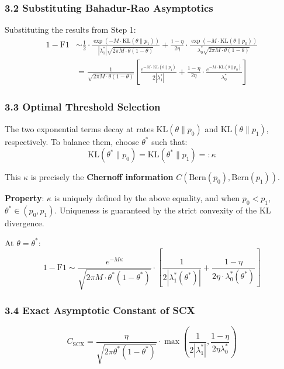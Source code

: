 \documentclass[
  12pt,
]{ctexart}
\begin{document}
\subsubsection{3.2 Substituting Bahadur-Rao Asymptotics}\label{substituting-bahadur-rao-asymptotics}

Substituting the results from Step 1:
\[\begin{aligned}
1 - \text{F1} &\sim \frac{1}{2} \cdot \frac{\exp(-M \cdot \text{KL}(\theta \| p_1))}{|\lambda_1^*|\sqrt{2\pi M \cdot \theta(1-\theta)}} + \frac{1-\eta}{2\eta} \cdot \frac{\exp(-M \cdot \text{KL}(\theta \| p_0))}{\lambda_0^*\sqrt{2\pi M \cdot \theta(1-\theta)}} \\
&= \frac{1}{\sqrt{2\pi M \cdot \theta(1-\theta)}} \left[\frac{e^{-M \cdot \text{KL}(\theta \| p_1)}}{2|\lambda_1^*|} + \frac{1-\eta}{2\eta} \cdot \frac{e^{-M \cdot \text{KL}(\theta \| p_0)}}{\lambda_0^*}\right]
\end{aligned}\]

\subsubsection{3.3 Optimal Threshold Selection}\label{optimal-threshold-selection}

The two exponential terms decay at rates \(\text{KL}(\theta \| p_0)\) and \(\text{KL}(\theta \| p_1)\), respectively. To balance them, choose \(\theta^*\) such that:
\[\text{KL}(\theta^* \| p_0) = \text{KL}(\theta^* \| p_1) =: \kappa\]

This \(\kappa\) is precisely the \textbf{Chernoff information} \(C(\text{Bern}(p_0), \text{Bern}(p_1))\).

\textbf{Property}: \(\kappa\) is uniquely defined by the above equality, and when \(p_0 < p_1\), \(\theta^* \in (p_0, p_1)\). Uniqueness is guaranteed by the strict convexity of the KL divergence.

At \(\theta = \theta^*\):
\[1 - \text{F1} \sim \frac{e^{-M\kappa}}{\sqrt{2\pi M \cdot \theta^*(1-\theta^*)}} \cdot \left[\frac{1}{2|\lambda_1^*(\theta^*)|} + \frac{1-\eta}{2\eta \cdot \lambda_0^*(\theta^*)}\right]\]

\subsubsection{3.4 Exact Asymptotic Constant of SCX}\label{exact-asymptotic-constant-of-scx}

\[\boxed{C_{\text{SCX}} = \frac{\eta}{\sqrt{2\pi\theta^*(1-\theta^*)}} \cdot \max\left(\frac{1}{2|\lambda_1^*|}, \frac{1-\eta}{2\eta\lambda_0^*}\right)}\]
\end{document}
